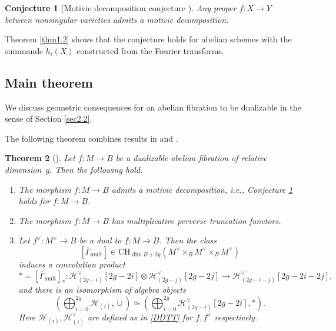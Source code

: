 \documentclass[11pt]{amsart}
\theoremstyle{plain}
\newtheorem{thm}{Theorem}[section]
\newtheorem{conj}[thm]{Conjecture}
\theoremstyle{definition}
\theoremstyle{remark}
\newcommand{\CH}{{\mathcal H}}
\begin{document}
\begin{conj}[Motivic decomposition conjecture \cite{CH}]\label{conj3.1}
Any proper $f: X\to Y$ between nonsingular varieties admits a motivic decomposition.
\end{conj}

Theorem \ref{thm1.2} shows that the conjecture holds for abelian schemes with the summands $h_i(X)$ constructed from the Fourier transforms.


\subsection{Main theorem}
We discuss geometric consequences for an abelian fibration to be dualizable in the sense of Section \ref{sec2.2}. 


The following theorem combines results in \cite{MSY} and \cite{BMSY2}.

\begin{thm}[\cite{MSY, BMSY2}]\label{thm3.2} 
Let $f: M \to B$ be a dualizable abelian fibration of relative dimension~$g$. Then the following hold.
\begin{enumerate}
    \item[(a)] The morphism $f: M \to B$ admits a motivic decomposition, \emph{i.e.}, Conjecture \ref{conj3.1} holds for $f: M\to B$.
    \item[(b)] The morphism $f: M \to B$ has multiplicative perverse truncation functors.
    \item[(c)] Let $f^\vee: M^\vee \to B$ be a dual to $f: M \to B$. Then the class \[[\overline{\Gamma}_{\mathrm{mult}}] \in \mathrm{CH}_{\dim B +2g}(M^\vee \times_B M^\vee \times_B M^\vee)
    \]
    induces a convolution product 
    \[
\ast = [\overline{\Gamma}_{\mathrm{mult}}]_*: \CH^\vee_{(2g-i)}[2g - 2i] \otimes \CH^\vee_{(2g-j)}[2g - 2j] \to  \CH^\vee_{(2g-i-j)}[2g - 2i - 2j],
    \]
    and there is an isomorphism of algebra objects
    \[
    \left(\bigoplus_{i=0}^{2g} \CH_{(i)}, \overline{\cup}\right) \simeq  \left(\bigoplus_{i=0}^{2g} \CH^\vee_{(2g-i)}[2g - 2i], \ast \right).
    \]
    Here $\CH_{(i)}, \CH^\vee_{(i)}$ are defined as in \eqref{DDTT} for $f, f^\vee$ respectively.
\end{enumerate}
\end{thm}

\end{document}
